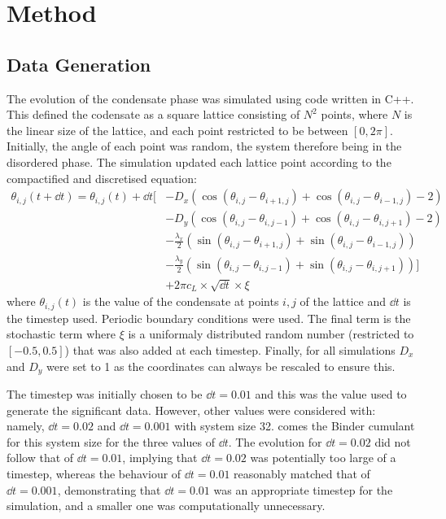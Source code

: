 \chapter{Method} 
\section{Data Generation}

The evolution of the condensate phase was simulated using code written in C++. This defined the codensate as a square lattice consisting of $N^2$ points, where $N$ is the linear size of the lattice, and each point restricted to be between $[0, 2 \pi]$. Initially, the angle of each point was random, the system therefore being in the disordered phase. The simulation updated each lattice point according to the compactified and discretised equation:
\[
\begin{split}
\theta_{i,j}(t +\dd{t}) = \theta_{i,j}(t) +  \dd{t}[&- D_x ( \cos(\theta_{i,j} - \theta_{i+1,j}) + \cos( \theta_{i,j} - \theta_{i-1,j}) - 2)\\
 					&- D_y(\cos(\theta_{i,j} - \theta_{i,j-1}) + \cos(\theta_{i,j} - \theta_{i,j+1}) - 2) \\
					& -\frac{\lambda_x}{2}(\sin(\theta_{i,j} - \theta_{i+1,j}) + \sin( \theta_{i,j} - \theta_{i-1,j}) ) \\ 
					& -\frac{\lambda_y}{2}(\sin(\theta_{i,j} - \theta_{i,j-1}) + \sin(\theta_{i,j} - \theta_{i,j+1}))] \\
					& +2\pi c_L \times \sqrt{\dd{t}} \times \xi 
\end{split}
\]
where $\theta_{i,j}(t)$ is the value of the condensate at points $i,j$ of the lattice and $\dd{t}$ is the timestep used. Periodic boundary conditions were used. The final term is the stochastic term where $\xi$ is a uniformaly distributed random number (restricted to $[-0.5, 0.5]$) that was also added at each timestep. Finally, for all simulations $D_x$ and $D_y$ were set to 1 as the coordinates can always be rescaled to ensure this.  

The timestep was initially chosen to be $\dd{t}=0.01$ and this was the value used to generate the significant data. However, other values were considered with: namely, $\dd{t} = 0.02$ and $\dd{t} = 0.001$ with system size 32. \fig{\ref{fig:binder_different_cL}} comes the Binder cumulant for this system size for the three values of $\dd{t}$. The evolution for $\dd{t}=0.02$  did not follow that of $\dd{t}=0.01$, implying that $\dd{t}=0.02$ was potentially too large of a timestep, whereas the behaviour of $\dd{t}=0.01$ reasonably matched that of $\dd{t}=0.001$, demonstrating that $\dd{t}=0.01$ was an appropriate timestep for the simulation, and a smaller one was computationally unnecessary. 

